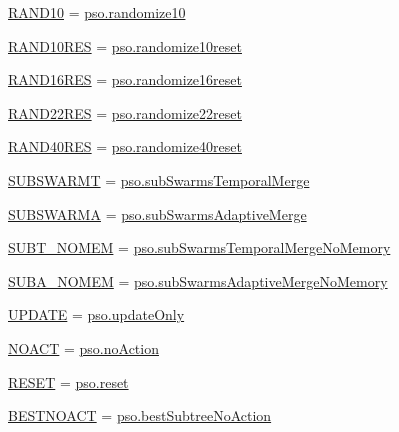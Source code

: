 \begin{CompactItemize}
\item 
\hyperlink{namespacewriteBatch_6d1164c3e9c081091446db6aa963ddf7}{RAND10} = \hyperlink{namespacepso_260382a7354d4ba0410e76449496c067}{pso.randomize10}
\item 
\hyperlink{namespacewriteBatch_68d16b5b3617073fd88f35bd68ac1cc0}{RAND10RES} = \hyperlink{namespacepso_7fdd5e29189f9d9656bd03d9e03dd090}{pso.randomize10reset}
\item 
\hyperlink{namespacewriteBatch_cf196e8b0847d472ac40809497d62693}{RAND16RES} = \hyperlink{namespacepso_5df7a62ecfc956224a62f3799a3e6ef7}{pso.randomize16reset}
\item 
\hyperlink{namespacewriteBatch_05d0068c6500a30534c598e2ca91edea}{RAND22RES} = \hyperlink{namespacepso_ab1bfa5a8f773b0dbd108e56e463ead6}{pso.randomize22reset}
\item 
\hyperlink{namespacewriteBatch_86b99a7496ef4f32d62658acaf67d4f2}{RAND40RES} = \hyperlink{namespacepso_5b0754f983b633969aaa27a602045d33}{pso.randomize40reset}
\item 
\hyperlink{namespacewriteBatch_908943be7f2ef49daf9309229cd5e4cc}{SUBSWARMT} = \hyperlink{namespacepso_debdf9baf8a4e2556c5038691f2dd74f}{pso.subSwarmsTemporalMerge}
\item 
\hyperlink{namespacewriteBatch_bf8b31b76d6381edc459be332eedec9c}{SUBSWARMA} = \hyperlink{namespacepso_8f1f2f1a4d2cf72cdcf78a45126c214f}{pso.subSwarmsAdaptiveMerge}
\item 
\hyperlink{namespacewriteBatch_438471a281f5c3b5554902ffcfc8c43f}{SUBT\_\-NOMEM} = \hyperlink{namespacepso_08235d686c3fa57b7ff88c31c1daadde}{pso.subSwarmsTemporalMergeNoMemory}
\item 
\hyperlink{namespacewriteBatch_44e8a997d997be093de9534b2559acf5}{SUBA\_\-NOMEM} = \hyperlink{namespacepso_96418ff4d13777d965c2625ee7ef4e04}{pso.subSwarmsAdaptiveMergeNoMemory}
\item 
\hyperlink{namespacewriteBatch_35dbca121f095e3ed1e186e3bac12636}{UPDATE} = \hyperlink{namespacepso_018821983caf2879464cd3fe04ee7bc2}{pso.updateOnly}
\item 
\hyperlink{namespacewriteBatch_8643f79b8d739b4cc514a5bbc1ba185c}{NOACT} = \hyperlink{namespacepso_07ff59caf4cb767c47b442f92815c537}{pso.noAction}
\item 
\hyperlink{namespacewriteBatch_353b87385e1a1c6093c5129369e34bb3}{RESET} = \hyperlink{namespacepso_c7ff04d712f964c312af61b819389cd2}{pso.reset}
\item 
\hyperlink{namespacewriteBatch_3903ca5cd3f94b2f41abb3d27ec8f508}{BESTNOACT} = \hyperlink{namespacepso_2737e8486a12d9feb9ae65b954f424e3}{pso.bestSubtreeNoAction}

\end{CompactItemize}
